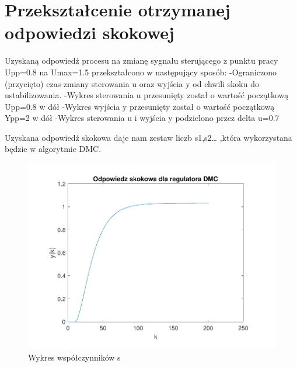 \section{Przekształcenie otrzymanej odpowiedzi skokowej}

Uzyskaną odpowiedź procesu na zmianę sygnału sterującego z punktu pracy Upp=\num{0.8} na Umax=\num{1.5} przekształcono w następujący sposób:
-Ograniczono (przycięto) czas zmiany sterowania u oraz wyjścia y od chwili skoku do ustabilizowania.
-Wykres sterowania u przesunięty został o wartość początkową Upp=\num{0.8} w dół
-Wykres wyjścia y przesunięty został o wartość początkową Ypp=\num{2} w dół
-Wykres sterowania u i wyjścia y podzielono przez delta u=\num{0.7}

Uzyskana odpowiedź skokowa daje nam zestaw liczb s1,s2… ,która wykorzystana będzie w algorytmie DMC.

\begin{figure}[H]
    \centering
    \includegraphics[scale=0.8]{../projekt/zad3/s.pdf}
    \caption{ Wykres współczynników s }
\end{figure}
